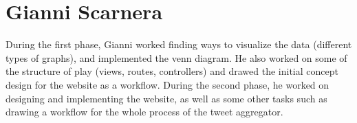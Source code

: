 \section{Gianni Scarnera}

During the first phase, Gianni worked finding ways to visualize the data (different types of graphs), and implemented the venn diagram. He also worked on some of the structure of play (views, routes, controllers) and drawed the initial concept design for the website as a workflow. During the second phase, he worked on designing and implementing the website, as well as some other tasks such as drawing a workflow for the whole process of the tweet aggregator.





